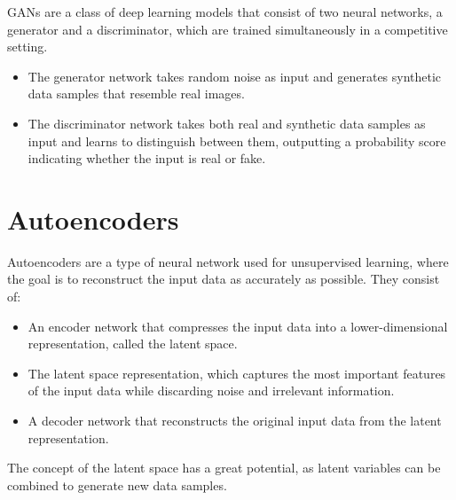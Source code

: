 GANs are a class of deep learning models that consist of two neural networks, a generator and a discriminator, which are trained simultaneously in a competitive setting.
\begin{itemize}
    \item The generator network takes random noise as input and generates synthetic data samples that resemble real images.
    \item The discriminator network takes both real and synthetic data samples as input and learns to distinguish between them, outputting a probability score indicating whether the input is real or fake.
\end{itemize}


\section{Autoencoders}

Autoencoders are a type of neural network used for unsupervised learning, where the goal is to reconstruct the input data as accurately as possible. They consist of:
\begin{itemize}
    \item An encoder network that compresses the input data into a lower-dimensional representation, called the latent space.
    \item The latent space representation, which captures the most important features of the input data while discarding noise and irrelevant information.
    \item A decoder network that reconstructs the original input data from the latent representation.
\end{itemize}

The concept of the latent space has a great potential, as latent variables can be combined to generate new data samples.